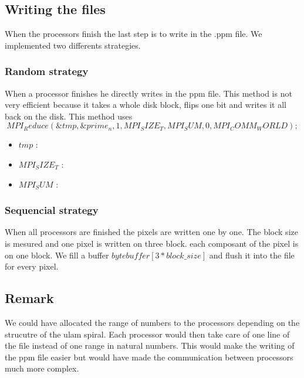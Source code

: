 \subsection{Writing the files}
When the processors finish the last step is to write in the .ppm file. We implemented two differents strategies.

\subsubsection{Random strategy}
When a processor finishes he directly writes in the ppm file. This method is not very efficient because it takes a whole disk block, flips one bit and writes it all back on the disk. This method uses $$MPI_Reduce(\&tmp, \&prime_n, 1, MPI_SIZE_T, MPI_SUM, 0, MPI_COMM_WORLD);$$  

\begin{itemize}

	\item{$tmp$ :}
	\item{$MPI_SIZE_T$ :}
	\item{$MPI_SUM$ :} 

\end{itemize}

\subsubsection{Sequencial strategy}
When all processors are finished the pixels are written one by one. The block size is mesured and one pixel is written on three block. each composant of the pixel is on one block. We fill a buffer $byte buffer[3*block\_size]$ and flush it into the file for every pixel.

\subsection{Remark}
We could have allocated the range of numbers to the processors depending on the strucutre of the ulam spiral. Each processor would then take care of one line of the file instead of one range in natural numbers. This would make the writing of the ppm file easier but would have made the communication between processors much more complex.